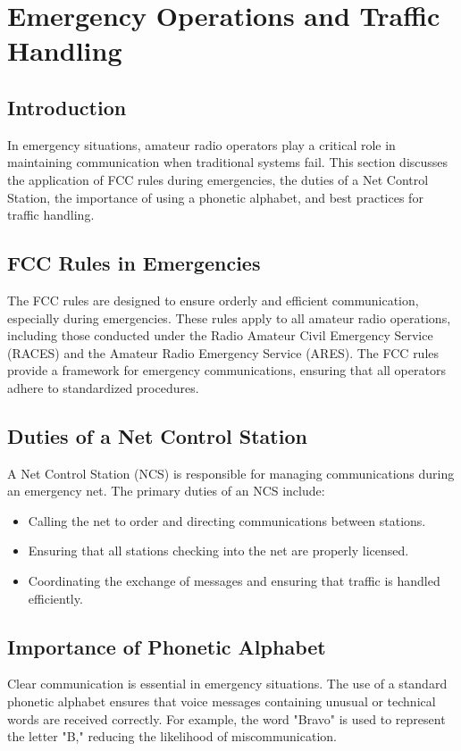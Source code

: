 \section{Emergency Operations and Traffic Handling}
\label{section:emergency_operations}

\subsection*{Introduction}
In emergency situations, amateur radio operators play a critical role in maintaining communication when traditional systems fail. This section discusses the application of FCC rules during emergencies, the duties of a Net Control Station, the importance of using a phonetic alphabet, and best practices for traffic handling.

\subsection*{FCC Rules in Emergencies}
The FCC rules are designed to ensure orderly and efficient communication, especially during emergencies. These rules apply to all amateur radio operations, including those conducted under the Radio Amateur Civil Emergency Service (RACES) and the Amateur Radio Emergency Service (ARES). The FCC rules provide a framework for emergency communications, ensuring that all operators adhere to standardized procedures.

\subsection*{Duties of a Net Control Station}
A Net Control Station (NCS) is responsible for managing communications during an emergency net. The primary duties of an NCS include:
\begin{itemize}
    \item Calling the net to order and directing communications between stations.
    \item Ensuring that all stations checking into the net are properly licensed.
    \item Coordinating the exchange of messages and ensuring that traffic is handled efficiently.
\end{itemize}

\subsection*{Importance of Phonetic Alphabet}
Clear communication is essential in emergency situations. The use of a standard phonetic alphabet ensures that voice messages containing unusual or technical words are received correctly. For example, the word "Bravo" is used to represent the letter "B," reducing the likelihood of miscommunication.


